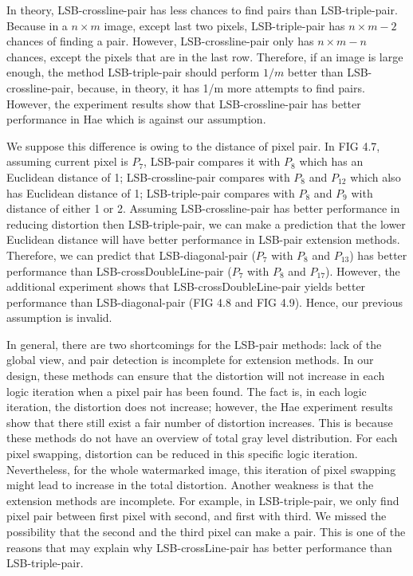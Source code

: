 In theory, LSB-crossline-pair has less chances to find pairs than LSB-triple-pair. Because in a \(n \times m\) image, except last two pixels, LSB-triple-pair has \(n \times m -2\) chances of finding a pair. However, LSB-crossline-pair only has \(n \times m - n\) chances, except the pixels that are in the last row. Therefore, if an image is large enough, the method LSB-triple-pair should perform \(1/m\) better than LSB-crossline-pair, because, in theory, it has 1/m more attempts to find pairs. However, the experiment results show that LSB-crossline-pair has better performance in Hae which is against our assumption. 

We suppose this difference is owing to the distance of pixel pair. In FIG 4.7, assuming current pixel is \(P_{7}\), LSB-pair compares it with \(P_{8}\) which has an Euclidean distance of 1; LSB-crossline-pair compares with \(P_{8}\) and \(P_{12}\) which also has Euclidean distance of 1; LSB-triple-pair compares with \(P_{8}\) and \(P_{9}\) with distance of either 1 or 2. Assuming LSB-crossline-pair has better performance in reducing distortion then LSB-triple-pair, we can make a prediction that the lower Euclidean distance will have better performance in LSB-pair extension methods. Therefore, we can predict that LSB-diagonal-pair (\(P_{7}\) with \(P_{8}\) and \(P_{13}\)) has better performance than LSB-crossDoubleLine-pair (\(P_{7}\) with \(P_{8}\) and \(P_{17}\)). However, the additional experiment shows that LSB-crossDoubleLine-pair yields better performance than LSB-diagonal-pair (FIG 4.8 and FIG 4.9). Hence, our previous assumption is invalid. 

In general, there are two shortcomings for the LSB-pair methods: lack of the global view, and pair detection is incomplete for extension methods. In our design, these methods can ensure that the distortion will not increase in each logic iteration when a pixel pair has been found. The fact is, in each logic iteration, the distortion does not increase; however, the Hae experiment results show that there still exist a fair number of distortion increases. This is because these methods do not have an overview of total gray level distribution. For each pixel swapping, distortion can be reduced in this specific logic iteration. Nevertheless, for the whole watermarked image, this iteration of pixel swapping might lead to increase in the total distortion. Another weakness is that the extension methods are incomplete. For example, in LSB-triple-pair, we only find pixel pair between first pixel with second, and first with third. We missed the possibility that the second and the third pixel can make a pair. This is one of the reasons that may explain why LSB-crossLine-pair has better performance than LSB-triple-pair. 


